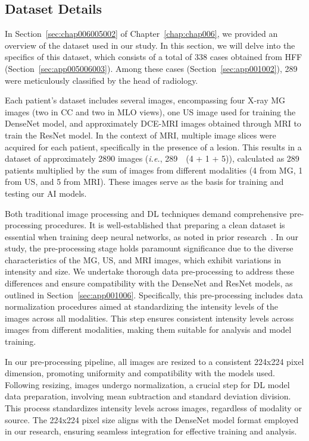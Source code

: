 \subsection{Dataset Details}
\label{sec:app005006002}

\textcolor{revised}{In Section~\ref{sec:chap006005002} of Chapter~\ref{chap:chap006}, we provided an overview of the dataset used in our study.
In this section, we will delve into the specifics of this dataset, which consists of a total of 338 cases obtained from \acl{HFF} (Section~\ref{sec:app005006003}).
Among these cases (Section~\ref{sec:app001002}), 289 were meticulously classified by the head of radiology.}

\textcolor{revised}{Each patient's dataset includes several images, encompassing four X-ray \ac{MG} images (two in \ac{CC} and two in \ac{MLO} views), one \ac{US} image used for training the DenseNet model, and approximately \acs{DCE-MRI} images obtained through \ac{MRI} to train the ResNet model.
In the context of \ac{MRI}, multiple image slices were acquired for each patient, specifically in the presence of a lesion.
This results in a dataset of approximately 2890 images ({\it i.e.}, 289~\texttimes~(4 + 1 + 5)), calculated as 289 patients multiplied by the sum of images from different modalities (4 from \ac{MG}, 1 from \ac{US}, and 5 from \ac{MRI}).
These images serve as the basis for training and testing our \ac{AI} models.}

\textcolor{revised}{Both traditional image processing and \ac{DL} techniques demand comprehensive pre-processing procedures.
It is well-established that preparing a clean dataset is essential when training deep neural networks, as noted in prior research~\cite{RIASATIAN2021102032}.
In our study, the pre-processing stage holds paramount significance due to the diverse characteristics of the \ac{MG}, \ac{US}, and \ac{MRI} images, which exhibit variations in intensity and size.
We undertake thorough data pre-processing to address these differences and ensure compatibility with the DenseNet and ResNet models, as outlined in Section~\ref{sec:app001006}.
Specifically, this pre-processing includes data normalization procedures aimed at standardizing the intensity levels of the images across all modalities.
This step ensures consistent intensity levels across images from different modalities, making them suitable for analysis and model training.}

\textcolor{revised}{In our pre-processing pipeline, all images are resized to a consistent 224x224 pixel dimension, promoting uniformity and compatibility with the models used.
Following resizing, images undergo normalization, a crucial step for \ac{DL} model data preparation, involving mean subtraction and standard deviation division.
This process standardizes intensity levels across images, regardless of modality or source.
The 224x224 pixel size aligns with the DenseNet model format employed in our research, ensuring seamless integration for effective training and analysis.}

